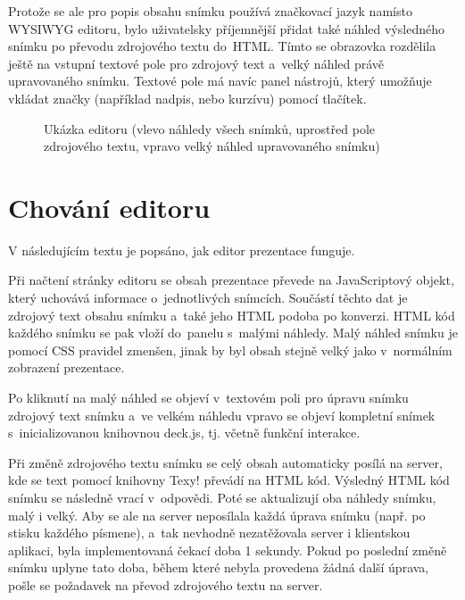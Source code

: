\documentclass[11pt,twoside,a4paper]{book}
\begin{document}
Protože se ale pro popis obsahu snímku používá značkovací jazyk namísto WYSIWYG editoru, bylo uživatelsky příjemnější přidat také náhled výsledného snímku po převodu zdrojového textu do~HTML. Tímto se obrazovka rozdělila ještě na vstupní textové pole pro zdrojový text a~velký náhled právě upravovaného snímku. Textové pole má navíc panel nástrojů, který umožňuje vkládat značky (například nadpis, nebo kurzívu) pomocí tlačítek.

\begin{figure}[ht]
	\begin{center}
		\caption[Ukázka editoru]{Ukázka editoru (vlevo náhledy všech snímků, uprostřed pole zdrojového textu, vpravo velký náhled upravovaného snímku)}
		\label{fig:editorLayout}
	\end{center}
\end{figure}


\section{Chování editoru}
V následujícím textu je popsáno, jak editor prezentace funguje.

Při načtení stránky editoru se obsah prezentace převede na Java\-Scriptový objekt, který uchovává informace o~jednotlivých snímcích. Součástí těchto dat je zdrojový text obsahu snímku a~také jeho HTML podoba po konverzi. HTML kód každého snímku se pak vloží do~panelu s~malými náhledy. Malý náhled snímku je pomocí CSS pravidel zmenšen, jinak by byl obsah stejně velký jako v~normálním zobrazení prezentace.

Po kliknutí na malý náhled se objeví v~textovém poli pro úpravu snímku zdrojový text snímku a~ve velkém náhledu vpravo se objeví kompletní snímek s~inicializovanou knihovnou deck.js, tj. včetně funkční interakce.

Při změně zdrojového textu snímku se celý obsah automaticky posílá na server, kde se text pomocí knihovny Texy! převádí na HTML kód. Výsledný HTML kód snímku se následně vrací v~odpovědi. Poté se aktualizují oba náhledy snímku, malý i velký. Aby se ale na server neposílala každá úprava snímku (např. po stisku každého písmene), a~tak nevhodně nezatěžovala server i klientskou aplikaci, byla imple\-mentovaná čekací doba 1 sekundy. Pokud po poslední změně snímku uplyne tato doba, během které nebyla provedena žádná další úprava, pošle se požadavek na převod zdrojového textu na server.
\end{document}
